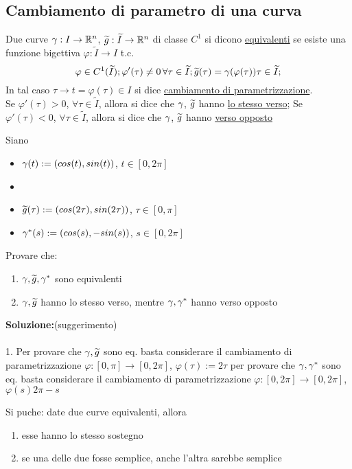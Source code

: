 \subsection{Cambiamento di parametro di una curva} 
\begin{definition}
  Due curve $\gamma : I \to \mathbb{R}^n$, $\widetilde{g}:\widetilde{I}\to\mathbb{R}^n$ di classe $C^1$ si dicono \underline{equivalenti}
  se esiste una funzione bigettiva $\varphi:\widetilde{I}\to I$ t.c. 
  $$\varphi \in C^1(\widetilde{I}); \varphi'(\tau) \neq 0 \, \forall \tau \in \widetilde{I};
  \widetilde{g}(\tau) = \gamma(\varphi(\tau)) \tau \in \widetilde{I};$$
  In tal caso $\tau \rightarrow t = \varphi(\tau) \in I$ si dice \underline{cambiamento di parametrizzazione}.\\
  Se $\varphi'(\tau)>0$, $\forall\tau \in\widetilde{I}$, allora si dice che $\gamma$, $\widetilde{g}$ hanno
  \underline{lo stesso verso}; Se $\varphi'(\tau)<0$, $\forall\tau \in\widetilde{I}$, allora si dice che $\gamma$, $\widetilde{g}$ hanno
  \underline{verso opposto}
\end{definition}
\begin{exercise}
  Siano
  \begin{itemize}
    \item $\gamma(t) := (cos(t), sin(t))$, $t \in [0,2\pi]$
    \item \item $\widetilde{g}(\tau) := (cos(2\tau), sin(2\tau))$, $\tau \in [0,\pi]$
    \item $\gamma^*(s) := (cos(s), -sin(s))$, $s \in [0,2\pi]$
  \end{itemize}
  Provare che:
  \begin{enumerate}
    \item $\gamma,\widetilde{g}, \gamma^*$ sono equivalenti
    \item $\gamma,\widetilde{g}$ hanno lo stesso verso, mentre $\gamma,\gamma^*$ hanno verso opposto
  \end{enumerate}
  \textbf{Soluzione:}(suggerimento)\\\\
  1. Per provare che $\gamma, \widetilde{g}$ sono eq. basta considerare il cambiamento
  di parametrizzazione $\varphi:[0,\pi]\to[0,2\pi]$, $\varphi(\tau):= 2\tau$
  per provare che $\gamma,\gamma^*$ sono eq. basta considerare il cambiamento di 
  parametrizzazione $\varphi:[0,2\pi]\to[0,2\pi]$, $\varphi(s) 2\pi-s$
\end{exercise}
\begin{osservazione}
  Si pu\aco che: date due curve equivalenti, allora
  \begin{enumerate}
    \item esse hanno lo stesso sostegno
    \item se una delle due fosse semplice, anche l'altra sarebbe semplice
  \end{enumerate}
\end{osservazione}